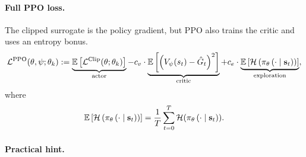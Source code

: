 \documentclass[11pt]{article}  %
\begin{document}
\paragraph{Full PPO loss.}
The clipped surrogate is the policy gradient, but PPO also trains the critic and uses an entropy bonus.
\begin{align*}
  \mathcal{L}^{\text{PPO}}(\theta, \psi; \theta_k) := \underbrace{\mathbb{E}\left[\mathcal{L}^{\text{Clip}}(\theta; \theta_k)\right]}_{\text{actor}} - c_v \cdot \underbrace{\mathbb{E}\left[\left( V_{\psi}(s_t) - \hat{G}_t \right)^2\right]}_{\text{critic}} + c_e \cdot \underbrace{\mathbb{E}\left[\mathcal{H}\left( \pi_{\theta}\left( \cdot \mid \mathbf{s}_t \right) \right)\right]}_{\text{exploration}},
\end{align*}
where 
\begin{align*}
  \mathbb{E}\left[\mathcal{H}\left( \pi_{\theta}\left( \cdot \mid \mathbf{s}_t \right) \right)\right] = \frac{1}{T}\sum_{t=0}^{T}\mathcal{H}(\pi_{\theta}\left( \cdot \mid \mathbf{s}_t \right)).
\end{align*}



\paragraph{Practical hint.} 
\end{document}
